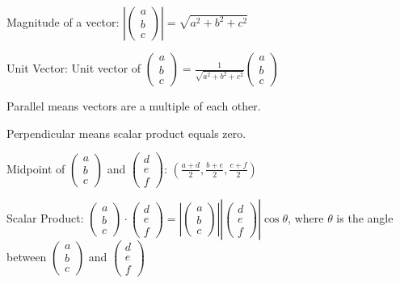 \documentclass[10pt,a4paper,oneside]{book}
\begin{document}
Magnitude of a vector: $\left|\begin{pmatrix}
    a\\b\\c 
\end{pmatrix}\right| = \sqrt{a^2+b^2+c^2}$

Unit Vector: Unit vector of $\begin{pmatrix}
    a\\b\\c 
\end{pmatrix}=\frac{1}{\sqrt{a^2+b^2+c^2}}\begin{pmatrix}
    a\\b\\c
\end{pmatrix}$

Parallel means vectors are a multiple of each other.

Perpendicular means scalar product equals zero.

Midpoint of $\begin{pmatrix}
    a\\b\\c
\end{pmatrix}$ and $\begin{pmatrix}
    d\\e\\f
\end{pmatrix}$: $\left(\frac{a+d}{2},\frac{b+e}{2},\frac{c+f}{2}\right)$

Scalar Product: $\begin{pmatrix}
    a\\b\\c 
\end{pmatrix}\cdot \begin{pmatrix}
    d\\e\\f
\end{pmatrix}=\left|\begin{pmatrix}
    a\\b\\c
\end{pmatrix}\right|\left|\begin{pmatrix}
    d\\e\\f
\end{pmatrix}\right|\cos\theta$, where $\theta$ is the angle between $\begin{pmatrix}
    a\\b\\c
\end{pmatrix}$ and $\begin{pmatrix}
    d\\e\\f
\end{pmatrix}$
\end{document}
